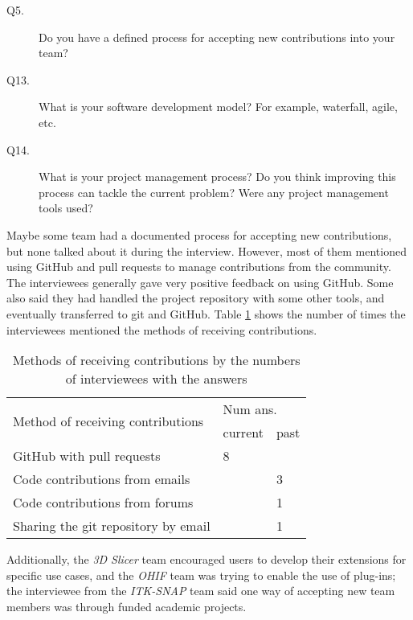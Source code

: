 \begin{description}
\item[Q5.] Do you have a defined process for accepting new contributions into your team?
\item[Q13.] What is your software development model? For example, waterfall, agile, etc.
\item[Q14.] What is your project management process? Do you think improving this process can tackle the current problem? Were any project management tools used?
\end{description}

\textit{}

\textit{}

\textit{}

Maybe some team had a documented process for accepting new contributions, but none talked about it during the interview. However, most of them mentioned using GitHub and pull requests to manage contributions from the community. The interviewees generally gave very positive feedback on using GitHub. Some also said they had handled the project repository with some other tools, and eventually transferred to git and GitHub. Table \ref{tab_method_receive_contributions} shows the number of times the interviewees mentioned the methods of receiving contributions.

\begin{table}[H]
\centering
\begin{tabular}{lll}
\hline
\multirow{2}{*}{Method of receiving contributions} & \multicolumn{2}{l}{Num ans.} \\ \cline{2-3} 
 & current & past \\ \hline
GitHub with pull requests & 8 & \\
Code contributions from emails & & 3 \\
Code contributions from forums & & 1 \\
Sharing the git repository by email & & 1 \\ \hline
\end{tabular}
\caption{\label{tab_method_receive_contributions}Methods of receiving contributions by the numbers of interviewees with the answers}
\end{table}

Additionally, the \textit{3D Slicer} team encouraged users to develop their extensions for specific use cases, and the \textit{OHIF} team was trying to enable the use of plug-ins; the interviewee from the \textit{ITK-SNAP} team said one way of accepting new team members was through funded academic projects. 

